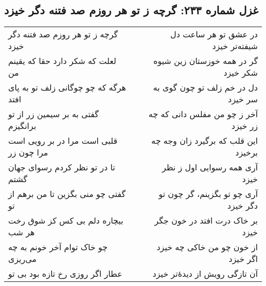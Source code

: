 \begin{center}
\section*{غزل شماره ۲۳۳: گرچه ز تو هر روزم صد فتنه دگر خیزد}
\label{sec:233}
\begin{longtable}{l p{0.5cm} r}
گرچه ز تو هر روزم صد فتنه دگر خیزد
&&
در عشق تو هر ساعت دل شیفته‌تر خیزد
\\
لعلت که شکر دارد حقا که یقینم من
&&
گر در همه خوزستان زین شیوه شکر خیزد
\\
هرگه که چو چوگانی زلف تو به پای افتد
&&
دل در خم زلف تو چون گوی به سر خیزد
\\
گفتی به بر سیمین زر از تو برانگیزم
&&
آخر ز چو من مفلس دانی که چه زر خیزد
\\
قلبی است مرا در بر رویی است مرا چون زر
&&
این قلب که برگیرد زان وجه چه برخیزد
\\
تا در تو نظر کردم رسوای جهان گشتم
&&
آری همه رسوایی اول ز نظر خیزد
\\
گفتی چو منی بگزین تا من برهم از تو
&&
آری چو تو بگزینم، گر چون تو دگر خیزد
\\
بیچاره دلم بی کس کز شوق رخت هر شب
&&
بر خاک درت افتد در خون جگر خیزد
\\
چو خاک توام آخر خونم به چه می‌ریزی
&&
از خون چو من خاکی چه خیزد اگر خیزد
\\
عطار اگر روزی رخ تازه بود بی تو
&&
آن تازگی رویش از دیدهٔ‌تر خیزد
\\
\end{longtable}
\end{center}
